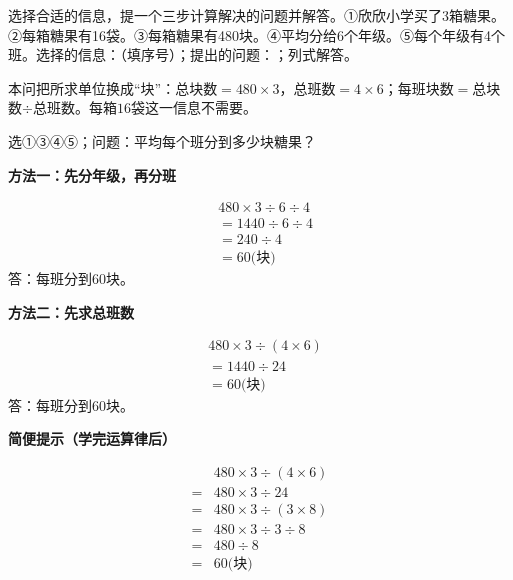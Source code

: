 选择合适的信息，提一个三步计算解决的问题并解答。①欣欣小学买了3箱糖果。②每箱糖果有16袋。③每箱糖果有480块。④平均分给6个年级。⑤每个年级有4个班。选择的信息：\BookBlank{}（填序号）；提出的问题：\BookBlank{}；列式解答。\par
\begin{BookAnswer}
本问把所求单位换成“块”：总块数\(=480\times3\)，总班数\(=4\times6\)；每班块数\(=\)总块数\(\div\)总班数。每箱\(16\)袋这一信息不需要。\par 选①③④⑤；问题：平均每个班分到多少块糖果？\par \par\noindent\begin{minipage}{\linewidth}\textbf{方法一：先分年级，再分班}\par \[\begin{aligned}&480\times3\div6\div4\\&=1440\div6\div4\\&=240\div4\\&=60\text{(块)}\end{aligned}\]答：每班分到\(60\)块。\end{minipage}\par \par \par\noindent\begin{minipage}{\linewidth}\textbf{方法二：先求总班数}\par \[\begin{aligned}&480\times3\div(4\times6)\\&=1440\div24\\&=60\text{(块)}\end{aligned}\]答：每班分到\(60\)块。\end{minipage}\par \par\textbf{简便提示（学完运算律后）}\par \[\begin{aligned}&480\times3\div(4\times6)\\={}&480\times3\div24\\={}&480\times3\div(3\times8)\\={}&480\times3\div3\div8\\={}&480\div8\\={}&60\text{(块)}\end{aligned}\]
\end{BookAnswer}

